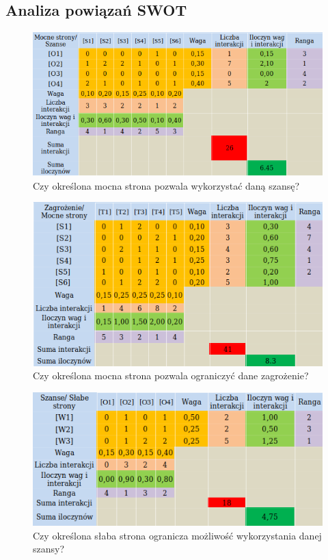 \documentclass[12pt]{article}
\begin{document}
	\subsection{Analiza powiązań SWOT}
	\begin{figure}[H]
		\centering
		\includegraphics[scale=1.0]{img/swot2.png}
		\caption{Czy określona mocna strona pozwala wykorzystać daną szansę?}
	\end{figure}
	\begin{figure}[H]
		\centering
		\includegraphics[scale=1.1]{img/swot3.png}
		\caption{Czy określona mocna strona pozwala ograniczyć dane zagrożenie?}
	\end{figure}
	\begin{figure}[H]
		\centering
		\includegraphics[scale=1.1]{img/swot4.png}
		\caption{Czy określona słaba strona ogranicza możliwość wykorzystania danej szansy?}
	\end{figure}
\end{document}
